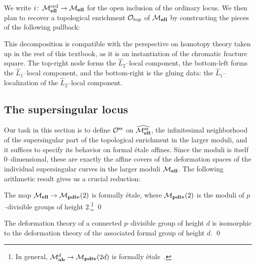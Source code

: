 \noindent We write \(i\colon\thinspace \mathcal{M}_{\mathbf{ell}}^{\mathrm{ord}} \to \mathcal{M}_{\mathbf{ell}}\) for the open inclusion of the ordinary locus.  We then plan to recover a topological enrichment $\mathcal{O}_{\mathrm{top}}$ of $\mathcal{M}_{\mathbf{ell}}$ by constructing the pieces of the following pullback:
\begin{center}
\end{center}
This decomposition is compatible with the perspective on homotopy theory taken up in the rest of this textbook, as it is an instantiation of the chromatic fracture square.  The top-right node forms the \(\widehat L_2\)--local component, the bottom-left forms the \(\widehat L_1\)--local component, and the bottom-right is the gluing data: the \(\widehat L_1\)--localization of the \(\widehat L_2\)--local component.






\subsection*{The supersingular locus}

Our task in this section is to define \(\mathcal{O}^{\mathrm{ss}}\) on \(\widehat{\mathcal{M}_{\mathbf{ell}}^{\mathrm{ss}}}\), the infinitesimal neighborhood of the supersingular part of the topological enrichment in the larger moduli, and it suffices to specify its behavior on formal \'etale affines.  Since the moduli is itself \(0\)--dimensional, these are exactly the affine covers of the deformation spaces of the individual supersingular curves in the larger moduli \(\mathcal{M}_{\mathbf{ell}}\).  The following arithmetic result gives us a crucial reduction:

\begin{theorem}
The map \(\mathcal{M}_{\mathbf{ell}} \to \mathcal{M}_{\mathbf{pdiv}}(2)\) is formally \'etale, where \(\mathcal{M}_{\mathbf{pdiv}}(2)\) is the moduli of \(p\)--divisible groups of height \(2\).\footnote{In general, \(\mathcal{M}_{\mathbf{ab}}^{d} \to \mathcal{M}_{\mathbf{pdiv}}(2d)\) is formally \'etale~\cite[Appendix 1]{KatzSTLocalModuli}.} \qed
\end{theorem}
\begin{lemma}
The deformation theory of a connected \(p\)--divisible group of height \(d\) is isomorphic to the deformation theory of the associated formal group of height \(d\). \qed
\end{lemma}

